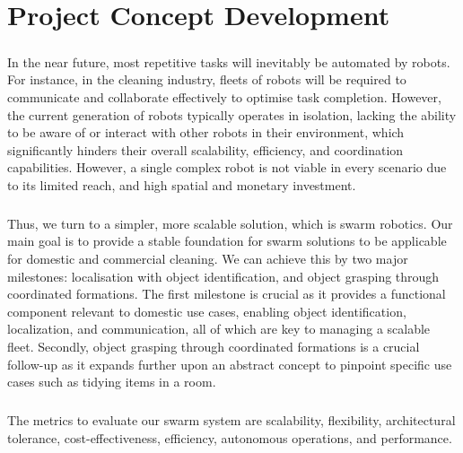\chapter{Project Concept Development}

\paragraph*{}
In the near future, most repetitive tasks will inevitably be automated by robots. For instance, in the cleaning industry, fleets of robots will be required to communicate and collaborate effectively to optimise task completion. However, the current generation of robots typically operates in isolation, lacking the ability to be aware of or interact with other robots in their environment, which significantly hinders their overall scalability, efficiency, and coordination capabilities. However, a single complex robot is not viable in every scenario due to its limited reach, and high spatial and monetary investment.

\paragraph*{}
Thus, we turn to a simpler, more scalable solution, which is swarm robotics. Our main goal is to provide a stable foundation for swarm solutions to be applicable for domestic and commercial cleaning. We can achieve this by two major milestones: localisation with object identification, and object grasping through coordinated formations. The first milestone is crucial as it provides a functional component relevant to domestic use cases, enabling object identification, localization, and communication, all of which are key to managing a scalable fleet. Secondly, object grasping through coordinated formations is a crucial follow-up as it expands further upon an abstract concept to pinpoint specific use cases such as tidying items in a room.

\paragraph*{}
The metrics to evaluate our swarm system are scalability, flexibility, architectural tolerance, cost-effectiveness, efficiency, autonomous operations, and performance.

